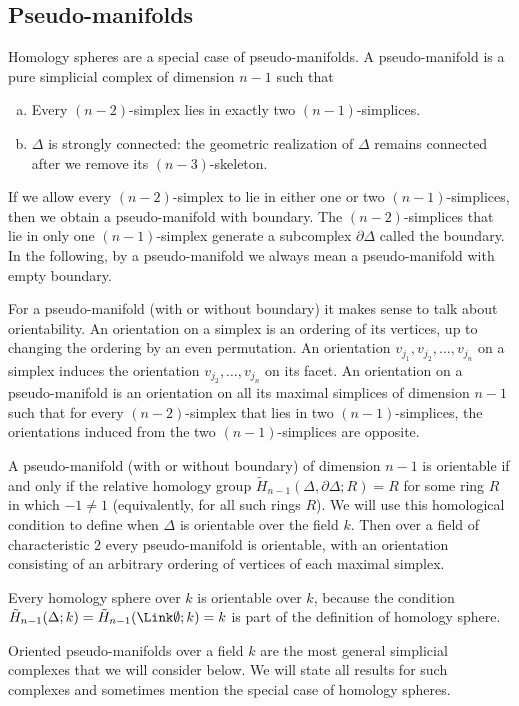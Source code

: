 \subsection{Pseudo-manifolds}
Homology spheres are a special case of pseudo-manifolds. A pseudo-manifold is a pure simplicial complex of dimension $n-1$ such that
\begin{enumerate}[(a) ]
\item Every  $(n-2)$-simplex  lies in exactly two $(n-1)$-simplices.
\item $\Delta$ is strongly connected: the geometric realization of $\Delta$ remains connected after we remove its $(n-3)$-skeleton. 
\end{enumerate}
If we allow every $(n-2)$-simplex to lie in either one or two $(n-1)$-simplices, then we obtain a pseudo-manifold with boundary. The $(n-2)$-simplices that lie in only one $(n-1)$-simplex generate a subcomplex $\partial \Delta$ called the boundary. In the following, by a pseudo-manifold we always mean a pseudo-manifold with empty boundary.


For a pseudo-manifold (with or without boundary) it makes sense to talk about orientability. An orientation on a simplex is an ordering of its vertices, up to changing the ordering by an even permutation. An orientation $v_{j_1}, v_{j_2}, \ldots, v_{j_n}$ on a simplex induces the orientation $v_{j_2}, \ldots, v_{j_n}$ on its facet. An orientation on a pseudo-manifold is an orientation on all its maximal simplices of dimension $n-1$ such that for every $(n-2)$-simplex that lies in two $(n-1)$-simplices, the orientations induced from the two $(n-1)$-simplices are opposite.

A pseudo-manifold (with or without boundary) of dimension $n-1$ is orientable if and only if the relative homology group $\tilde{H}_{n-1}(\Delta, \partial\Delta; R) = R$ for some ring $R$ in which $-1\neq 1$   (equivalently, for all such rings $R$). We will use this homological condition to define when $\Delta$ is orientable over the field $k$. Then over a field of characteristic $2$ every pseudo-manifold is orientable, with an orientation consisting of an arbitrary ordering of vertices of each maximal simplex.

Every homology sphere over $k$ is orientable over $k$, because the condition $\tilde{H}_{n-1}(\Delta; k) = \tilde{H}_{n-1}(\Link \emptyset; k) = k$  is part of the definition of homology sphere. 

Oriented pseudo-manifolds over a field $k$ are the most general simplicial complexes that we will consider below. We will state all results for such complexes and sometimes mention the special case of homology spheres.

